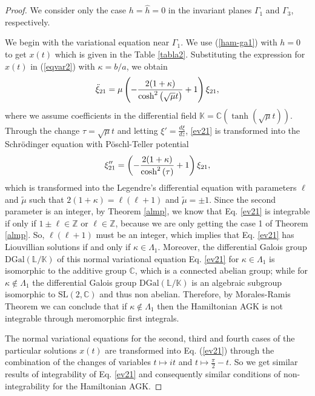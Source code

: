 \documentclass[final]{siamart0516}
\begin{document}
\begin{proof}
%
We consider only the case $h=\hat{h}=0$ in the invariant planes $\Gamma_1$ and $\Gamma_3$, respectively.

We begin with  the variational equation near  $\Gamma_1$. 
We use (\ref{ham-ga1}) with $h=0$ to get $x(t)$ which is given in the Table \ref{tabla2}.  Substituting the expression for 
$x(t)$ in (\ref{eqvar2}) with $\kappa=b/a$, we obtain
\begin{eqnarray}
\ddot\xi_{21}=\mu\left(-{2(1+\kappa)\over
\cosh^2\left(\sqrt{\mu}t\right)}+1\right)\xi_{21}\label{ev21},
\end{eqnarray}
where we assume coefficients in the differential field
$\mathbb{K}=\mathbb{C}(\tanh(\sqrt{\mu} t))$.
Through  the change $\tau=\sqrt{\mu}t$ and letting
$\displaystyle{\xi'=\frac{d\xi}{dz}}$, \eqref{ev21} is transformed into the Schr\"odinger equation with P\"oschl-Teller potential
\begin{equation}\label{integra-legendre}
\xi_{21}''=\left(-{2(1+\kappa)\over
\cosh^2\left(\tau\right)}+1\right)\xi_{21},
\end{equation}
which is transformed into the Legendre's differential equation with parameters $\ell$ and $\tilde{\mu}$ 
such that $2(1+\kappa)=\ell(\ell + 1)$ and $\tilde{\mu}=\pm1$. Since the second parameter is an integer, by Theorem \ref{almp}, we know that Eq. \eqref{ev21}  is integrable if only if
 $1\pm \ell \in \mathbb{Z}$ or $\ell\in \mathbb{Z}$, because we are only getting 
 the case 1 of Theorem \ref{almp}.
 So, $\ell (\ell
+1)$ must be  an integer, which implies that Eq. \eqref{ev21} has Liouvillian solutions if and only if $\kappa\in  \Lambda_1$. Moreover, the differential Galois group $\mathrm{DGal}(\mathbb{L}/\mathbb{K})$ of this normal variational equation Eq. \eqref{ev21} for $\kappa\in\Lambda_1$ is isomorphic to the additive group $\mathbb{C}$, which is a connected abelian group; while for $\kappa\notin \Lambda_1$ the differential Galois group $\mathrm{DGal}(\mathbb{L}/\mathbb{K})$ is an algebraic subgroup isomorphic to $\mathrm{SL}(2,\mathbb{C})$ and thus non abelian. Therefore, by Morales-Ramis Theorem we can conclude that if $\kappa\notin \Lambda_1$ then the Hamiltonian AGK is not integrable through meromorphic first integrals.

The normal variational equations for the second, third and fourth cases of the particular solutions $x(t)$ are transformed into  Eq. (\ref{ev21}) through the combination of the changes of variables $t\mapsto i t$ and  $t\mapsto \frac{\pi}{2}-t$.  
So we get similar results of integrability of Eq. \eqref{ev21} and  consequently  similar conditions of non-integrability 
for the Hamiltonian AGK. 


\end{proof}
\end{document}
